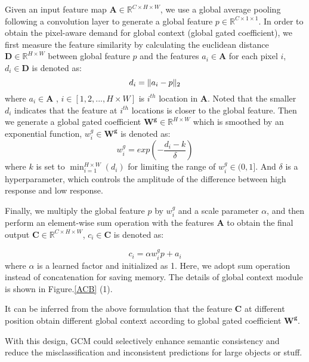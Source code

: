 \documentclass[10pt,twocolumn,letterpaper]{article}
\DeclarePairedDelimiter{\norm}{\lVert}{\rVert}
\begin{document}
Given an input feature map $\mathbf{A} \in \mathbb{R}^{C \times H \times W}$, we use a global average pooling following a convolution layer to  generate a global feature $p \in \mathbb{R}^{C \times 1 \times 1}$. 
In order to obtain the pixel-aware demand for global context (global gated coefficient), we first measure the feature similarity  by calculating the  euclidean distance  $\mathbf{D} \in \mathbb{R}^{H \times W}$ between global feature $p$ and  the features ${a_{i} \in \mathbf{A}}$ for each pixel $i$, ${d_{i} \in \mathbf{D}}$ is denoted as:
\begin{equation}
d_{i}=\norm{a_{i}-p}_{2}
\end{equation}
where ${a_{i} \in \mathbf{A}}$ , $i \in [1,2,...,H\times W]$ is  ${i^{th}}$ location in $ \mathbf{A}$.
Noted that  the smaller $d_{i}$ indicates that the feature at ${i^{th}}$ locations is closer to the global feature.  
Then we generate a global gated coefficient $\mathbf{W^g} \in \mathbb{R}^{H \times W}$  which is smoothed by an exponential function, ${w^g_{i} \in \mathbf{W^g}}$ is denoted as:
\begin{equation}
{w^g_{i}}=exp(-\frac{d_{i}-k }{ \delta} )
\end{equation}
where  $k$  is set to $\min_{i=1}^ {H\times W} (d_{i})$  for limiting the range of $w^g_{i} \in (0,1]$. And $\delta$ is a hyperparameter, which controls the amplitude of the difference between high response and low response.

Finally, we  multiply  the global feature $p$ by $w^g_{i}$ and a scale parameter $ \alpha $, and  then perform an element-wise sum operation with the features $\mathbf{A}$ to obtain the final output $\mathbf{C}\in \mathbb{R}^{C \times H \times W}$, ${c_{i} \in \mathbf{C}}$ is denoted as:

\begin{equation}
c_{i} =  \alpha w^g_{i}p + a_{i}
\label{equ1}\end{equation}
where $\alpha$ is a learned factor  and  initialized as 1. Here, we adopt sum operation instead of concatenation for saving memory. The details of global context module is shown in Figure.\ref{ACB} (1).

 It can be inferred from the above formulation that the feature $\mathbf{C}$  at different position obtain different global context according to global gated  coefficient $\mathbf{W^g}$. 

With this design, GCM could  selectively enhance semantic consistency and  reduce the  misclassification and inconsistent predictions for large objects or stuff.
\end{document}
